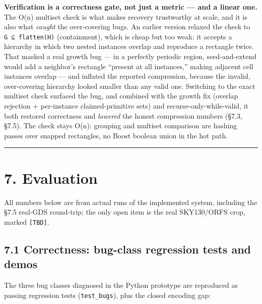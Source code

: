 \documentclass[
  11pt,
]{article}
\begin{document}
\textbf{Verification is a correctness gate, not just a metric --- and a
linear one.} The O(n) multiset check is what makes recovery trustworthy
at scale, and it is also what \emph{caught} the over-covering bugs. An
earlier version relaxed the check to \texttt{G\ ⊆\ flatten(H)}
(containment), which is cheap but too weak: it accepts a hierarchy in
which two nested instances overlap and reproduce a rectangle twice. That
masked a real growth bug --- in a perfectly periodic region,
seed-and-extend would add a neighbor's rectangle ``present at all
instances,'' making adjacent cell instances overlap --- and inflated the
reported compression, because the invalid, over-covering hierarchy
looked smaller than any valid one. Switching to the exact multiset check
surfaced the bug, and combined with the growth fix (overlap rejection +
per-instance claimed-primitive sets) and recurse-only-while-valid, it
both restored correctness and \emph{lowered} the honest compression
numbers (§7.3, §7.5). The check stays O(n): grouping and multiset
comparison are hashing passes over snapped rectangles, no Boost boolean
union in the hot path.

\begin{center}\rule{0.5\linewidth}{0.5pt}\end{center}

\section{7. Evaluation}\label{evaluation}

All numbers below are from actual runs of the implemented system,
including the §7.5 real-GDS round-trip; the only open item is the real
SKY130/ORFS crop, marked \texttt{{[}TBD{]}}.

\subsection{7.1 Correctness: bug-class regression tests and
demos}\label{correctness-bug-class-regression-tests-and-demos}

The three bug classes diagnosed in the Python prototype are reproduced
as passing regression tests (\texttt{test\_bugs}), plus the closed
encoding gap:
\end{document}
